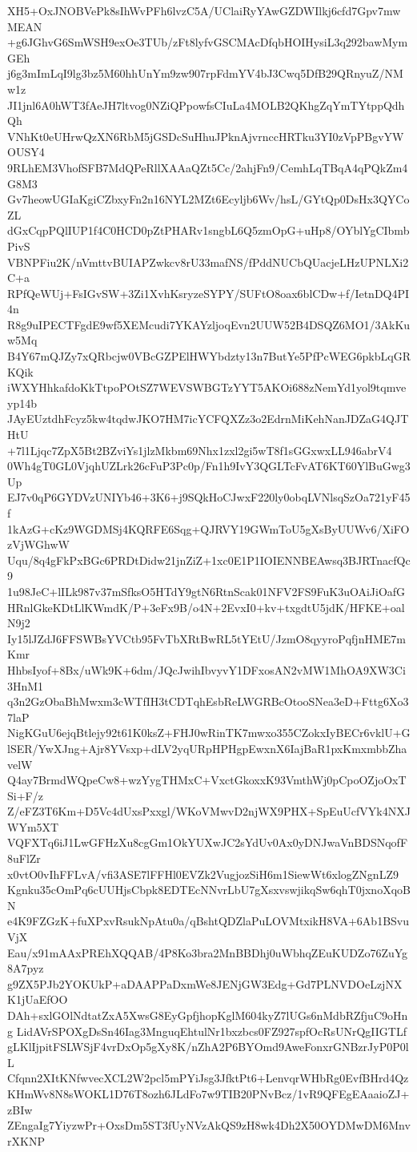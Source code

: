 XH5+OxJNOBVePk8sIhWvPFh6lvzC5A/UClaiRyYAwGZDWIlkj6cfd7Gpv7mwMEAN
+g6JGhvG6SmWSH9exOe3TUb/zFt8lyfvGSCMAcDfqbHOIHysiL3q292bawMymGEh
j6g3mImLqI9lg3bz5M60hhUnYm9zw907rpFdmYV4bJ3Cwq5DfB29QRnyuZ/NMw1z
JI1jnl6A0hWT3fAeJH7ltvog0NZiQPpowfsCIuLa4MOLB2QKhgZqYmTYtppQdhQh
VNhKt0eUHrwQzXN6RbM5jGSDcSuHhuJPknAjvrnccHRTku3YI0zVpPBgvYWOUSY4
9RLhEM3VhofSFB7MdQPeRllXAAaQZt5Cc/2ahjFn9/CemhLqTBqA4qPQkZm4G8M3
Gv7heowUGIaKgiCZbxyFn2n16NYL2MZt6Ecyljb6Wv/hsL/GYtQp0DsHx3QYCoZL
dGxCqpPQlIUP1f4C0HCD0pZtPHARv1sngbL6Q5zmOpG+uHp8/OYblYgCIbmbPivS
VBNPFiu2K/nVmttvBUIAPZwkcv8rU33mafNS/fPddNUCbQUacjeLHzUPNLXi2C+a
RPfQeWUj+FsIGvSW+3Zi1XvhKsryzeSYPY/SUFtO8oax6blCDw+f/IetnDQ4PI4n
R8g9uIPECTFgdE9wf5XEMcudi7YKAYzljoqEvn2UUW52B4DSQZ6MO1/3AkKuw5Mq
B4Y67mQJZy7xQRbcjw0VBcGZPElHWYbdzty13n7ButYe5PfPcWEG6pkbLqGRKQik
iWXYHhkafdoKkTtpoPOtSZ7WEVSWBGTzYYT5AKOi688zNemYd1yol9tqmveyp14b
JAyEUztdhFcyz5kw4tqdwJKO7HM7icYCFQXZz3o2EdrnMiKehNanJDZaG4QJTHtU
+7l1Ljqc7ZpX5Bt2BZviYs1jlzMkbm69Nhx1zxl2gi5wT8f1sGGxwxLL946abrV4
0Wh4gT0GL0VjqhUZLrk26cFuP3Pc0p/Fn1h9IvY3QGLTcFvAT6KT60YlBuGwg3Up
EJ7v0qP6GYDVzUNIYb46+3K6+j9SQkHoCJwxF220ly0obqLVNlsqSzOa721yF45f
1kAzG+cKz9WGDMSj4KQRFE6Sqg+QJRVY19GWmToU5gXsByUUWv6/XiFOzVjWGhwW
Uqu/8q4gFkPxBGc6PRDtDidw21jnZiZ+1xc0E1P1IOIENNBEAwsq3BJRTnacfQc9
1u98JeC+lILk987v37mSfksO5HTdY9gtN6RtnScak01NFV2FS9FuK3uOAiJiOafG
HRnlGkeKDtLlKWmdK/P+3eFx9B/o4N+2EvxI0+kv+txgdtU5jdK/HFKE+oalN9j2
Iy15lJZdJ6FFSWBsYVCtb95FvTbXRtBwRL5tYEtU/JzmO8qyyroPqfjnHME7mKmr
HhbsIyof+8Bx/uWk9K+6dm/JQcJwihIbvyvY1DFxosAN2vMW1MhOA9XW3Ci3HnM1
q3n2GzObaBhMwxm3cWTfIH3tCDTqhEsbReLWGRBcOtooSNea3eD+Fttg6Xo37laP
NigKGuU6ejqBtlejy92t61K0ksZ+FHJ0wRinTK7mwxo355CZokxIyBECr6vklU+G
lSER/YwXJng+Ajr8YVsxp+dLV2yqURpHPHgpEwxnX6IajBaR1pxKmxmbbZhavelW
Q4ay7BrmdWQpeCw8+wzYygTHMxC+VxctGkoxxK93VmthWj0pCpoOZjoOxTSi+F/z
Z/eFZ3T6Km+D5Vc4dUxsPxxgl/WKoVMwvD2njWX9PHX+SpEuUcfVYk4NXJWYm5XT
VQFXTq6iJ1LwGFHzXu8cgGm1OkYUXwJC2sYdUv0Ax0yDNJwaVnBDSNqofF8uFlZr
x0vtO0vIhFFLvA/vfi3ASE7lFFHl0EVZk2VugjozSiH6m1SiewWt6xlogZNgnLZ9
Kgnku35cOmPq6cUUHjsCbpk8EDTEcNNvrLbU7gXsxvswjikqSw6qhT0jxnoXqoBN
e4K9FZGzK+fuXPxvRsukNpAtu0a/qBshtQDZlaPuLOVMtxikH8VA+6Ab1BSvuVjX
Eau/x91mAAxPREhXQQAB/4P8Ko3bra2MnBBDhj0uWbhqZEuKUDZo76ZuYg8A7pyz
g9ZX5PJb2YOKUkP+aDAAPPaDxmWe8JENjGW3Edg+Gd7PLNVDOeLzjNXK1jUaEfOO
DAh+sxlGOlNdtatZxA5XwsG8EyGpfjhopKglM604kyZ7lUGs6nMdbRZfjuC9oHng
LidAVrSPOXgDsSn46Iag3MnguqEhtulNr1bxzbcs0FZ927spfOcRsUNrQgIIGTLf
gLKlIjpitFSLWSjF4vrDxOp5gXy8K/nZhA2P6BYOmd9AweFonxrGNBzrJyP0P0lL
Cfqnn2XItKNfwvecXCL2W2pcl5mPYiJsg3JfktPt6+LenvqrWHbRg0EvfBHrd4Qz
KHmWv8N8sWOKL1D76T8ozh6JLdFo7w9TIB20PNvBcz/1vR9QFEgEAaaioZJ+zBIw
ZEngaIg7YiyzwPr+OxsDm5ST3fUyNVzAkQS9zH8wk4Dh2X50OYDMwDM6MnvrXKNP
